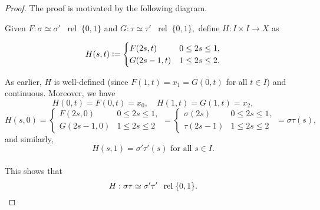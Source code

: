 \documentclass[12pt]{article}
\theoremstyle{definition}
\numberwithin{thm}{section}
\newcommand{\rel}{\;\;\operatorname{rel}\;}
\begin{document}
\begin{proof} 
	The proof is motivated by the following diagram.\\
	\begin{center}
	\end{center}

	Given $F:\sigma \simeq \sigma' \rel \{0, 1\}$ and $G:\tau \simeq \tau' \rel \{0, 1\},$ define $H:I \times I \to X$ as

	\begin{equation*} 
		H(s, t)\vcentcolon= \begin{cases}
				F(2s, t) & 0 \le 2s \le 1,\\
				G(2s - 1, t) & 1 \le 2s \le 2.
			\end{cases}
	\end{equation*}

	As earlier, $H$ is well-defined (since $F(1, t) = x_1 = G(0, t)$ for all $t \in I$) and continuous. Moreover, we have
	\begin{equation*} 
		H(0, t) = F(0, t) = x_0, \quad H(1, t) = G(1, t) = x_2,
	\end{equation*}
	\begin{equation*} 
		H(s, 0)= \begin{cases}
				F(2s, 0) & 0 \le 2s \le 1,\\
				G(2s - 1, 0) & 1 \le 2s \le 2
			\end{cases} = \begin{cases}
				\sigma(2s) & 0 \le 2s \le 1,\\
				\tau(2s - 1) & 1 \le 2s \le 2
			\end{cases} = \sigma\tau(s),
	\end{equation*}
	and similarly, 
	\begin{equation*} 
		H(s, 1) = \sigma'\tau'(s)\text{ for all }s \in I.
	\end{equation*}\\
	This shows that 
	\begin{equation*} 
		H : \sigma\tau\simeq\sigma'\tau' \rel \{0, 1\}. \qedhere
	\end{equation*}
\end{proof}
\end{document}
